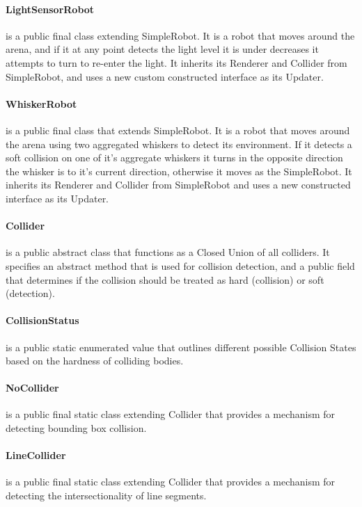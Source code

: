 \paragraph{LightSensorRobot} is a public final class extending SimpleRobot. It is a robot that moves around the arena, and if it at any point detects the light level it is under decreases it attempts to turn to re-enter the light. It inherits its Renderer and Collider from SimpleRobot, and uses a new custom constructed interface as its Updater.

\paragraph{WhiskerRobot} is a public final class that extends SimpleRobot. It is a robot that moves around the arena using two aggregated whiskers to detect its environment. If it detects a soft collision on one of it's aggregate whiskers it turns in the opposite direction the whisker is to it's current direction, otherwise it moves as the SimpleRobot. It inherits its Renderer and Collider from SimpleRobot and uses a new constructed interface as its Updater.

\paragraph{Collider} is a public abstract class that functions as a Closed Union of all colliders. It specifies an abstract method that is used for collision detection, and a public field that determines if the collision should be treated as hard (collision) or soft (detection).

\paragraph{CollisionStatus} is a public static enumerated value that outlines different possible Collision States based on the hardness of colliding bodies.

\paragraph{NoCollider} is a public final static class extending Collider that provides a mechanism for detecting bounding box collision.

\paragraph{LineCollider} is a public final static class extending Collider that provides a mechanism for detecting the intersectionality of line segments.


